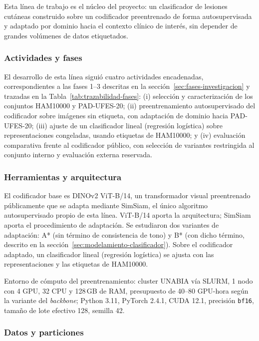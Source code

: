 Esta línea de trabajo es el núcleo del proyecto: un clasificador de lesiones cutáneas construido sobre un codificador preentrenado de forma autosupervisada y adaptado por dominio hacia el contexto clínico de interés, sin depender de grandes volúmenes de datos etiquetados.

\subsubsection{Actividades y fases}

El desarrollo de esta línea siguió cuatro actividades encadenadas, correspondientes a las fases 1--3 descritas en la sección~\ref{sec:fases-investigacion} y trazadas en la Tabla~\ref{tab:trazabilidad-fases}: (i) selección y caracterización de los conjuntos HAM10000 y PAD-UFES-20; (ii) preentrenamiento autosupervisado del codificador sobre imágenes sin etiqueta, con adaptación de dominio hacia PAD-UFES-20; (iii) ajuste de un clasificador lineal (regresión logística) sobre representaciones congeladas, usando etiquetas de HAM10000; y (iv) evaluación comparativa frente al codificador público, con selección de variantes restringida al conjunto interno y evaluación externa reservada.

\subsubsection{Herramientas y arquitectura}

El codificador base es DINOv2 ViT-B/14, un transformador visual preentrenado públicamente que se adapta mediante SimSiam, el único algoritmo autosupervisado propio de esta línea. ViT-B/14 aporta la arquitectura; SimSiam aporta el procedimiento de adaptación. Se estudiaron dos variantes de adaptación: A* (sin término de consistencia de tono) y B* (con dicho término, descrito en la sección~\ref{sec:modelamiento-clasificador}). Sobre el codificador adaptado, un clasificador lineal (regresión logística) se ajusta con las representaciones y las etiquetas de HAM10000.

Entorno de cómputo del preentrenamiento: cluster UNABIA vía SLURM, 1 nodo con 4 GPU, 32 CPU y 128\,GB de RAM, presupuesto de 40--80 GPU-hora según la variante del \textit{backbone}; Python 3.11, PyTorch 2.4.1, CUDA 12.1, precisión \texttt{bf16}, tamaño de lote efectivo 128, semilla 42.

\subsubsection{Datos y particiones}

